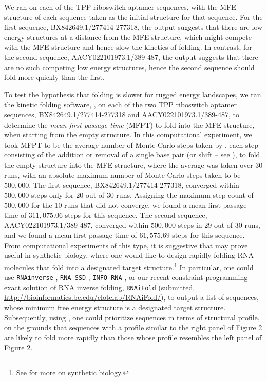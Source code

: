 We ran \fftbor on each of the TPP riboswitch aptamer
sequences, with the MFE structure of each
sequence taken as the initial structure \strSt for that sequence.  For the
first sequence, BX842649.1/277414-277318, the \fftbor output
suggests that there are low energy structures
at a distance from the MFE structure, which might compete with the MFE
structure and hence slow the kinetics of folding. In contrast, for the
second sequence, AACY022101973.1/389-487, the \fftbor output suggests
that there are no such competing low energy structures, hence
the second sequence should fold more quickly than the first.

To test the hypothesis that folding is slower for rugged energy landscapes,
we ran the kinetic folding software, \kinfold \cite{flamm},
on each of the two TPP riboswitch aptamer sequences,
BX842649.1/277414-277318 and AACY022101973.1/389-487,
to determine the {\em mean first passage time} (MFPT) to
fold into the MFE structure, when starting from the empty structure.
In this computational
experiment, we took MFPT to be the average number of Monte Carlo steps
taken by \kinfold, each step consisting of the addition or removal
of a single base pair (or shift -- see \cite{flamm}), to fold the
empty structure into the MFE
structure, where the average was taken over $30$ runs, with an absolute
maximum number of Monte Carlo steps taken to be $500,000$.
The first sequence, BX842649.1/277414-277318, converged within $500,000$
steps only for 20 out of 30 runs. Assigning the maximum step count of
$500,000$ for the 10 runs that did not converge, we found a mean first
passage time of $311,075.06$ steps for this sequence.
The second sequence, AACY022101973.1/389-487, converged within $500,000$
steps in 29 out of 30 runs, and we found a mean first passage time of
$61,575.69$ steps for this sequence. From computational experiments of this
type, it is suggestive that \fftbor may prove useful in synthetic
biology,
where one would like to design rapidly folding RNA molecules that
fold into a designated target structure.\footnote{See
\cite{Shetty.jbe08,Knight.msb05,Waldminghaus.bc08,Zadeh.jcc11} for more
on synthetic biology.} In particular, one could use
{\tt RNAinverse} \cite{hofacker:ViennaWebServer},
{\tt RNA-SSD} \cite{Andronescu04},
{\tt INFO-RNA} \cite{Busch06},
or our recent constraint programming exact
solution of RNA inverse folding, {\tt RNAiFold}
(submitted, \url{http://bioinformatics.bc.edu/clotelab/RNAiFold/}),
to output a list of sequences,
whose minimum free energy structure is a designated target structure.
Subsequently, using \fftbor, one could prioritize sequences in terms
of \fftbor structural profile, on the grounds that sequences with a profile
similar to the right panel of Figure 2
are likely to fold more rapidly than those whose profile resembles
the left panel of Figure 2.

